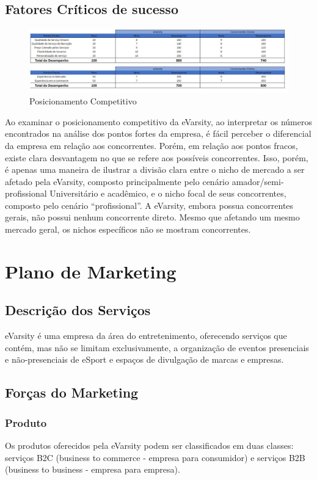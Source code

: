 \documentclass[a4paper, 12pt]{paper}
\begin{document}
\begin{landscape}
\subsection{Fatores Críticos de sucesso}
\begin{figure}[!ht]
    \centering
    \includegraphics[scale=0.56]{img/img08.png}
    \caption{Posicionamento Competitivo}
\end{figure}
Ao examinar o posicionamento competitivo da eVarsity, ao interpretar os números encontrados na análise dos pontos fortes da empresa, é fácil perceber o diferencial da empresa em relação aos concorrentes.  Porém, em relação aos pontos fracos, existe clara desvantagem no que se refere aos possíveis concorrentes. Isso, porém, é apenas uma maneira de ilustrar a divisão clara entre o nicho de mercado a ser afetado pela eVarsity, composto principalmente pelo cenário amador/semi-profissional Universitário e acadêmico, e o nicho focal de seus concorrentes, composto pelo cenário “profissional”. A eVarsity, embora possua concorrentes gerais, não possui nenhum concorrente direto. Mesmo que afetando um mesmo mercado geral, os nichos específicos não se mostram concorrentes.
\end{landscape}



\newpage
\section{Plano de Marketing}
\subsection{Descrição dos Serviços}
eVarsity é uma empresa da área do entretenimento, oferecendo serviços que contém, mas não se limitam exclusivamente, a organização de eventos presenciais e não-presenciais de eSport e espaços de divulgação de marcas e empresas.
\subsection{Forças do Marketing}
\subsubsection{Produto}
Os produtos oferecidos pela eVarsity podem ser classificados em duas classes: serviços B2C (business to commerce - empresa para consumidor) e serviços B2B (business to business - empresa para empresa).
\end{document}
